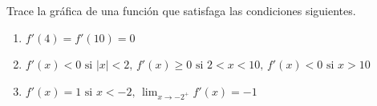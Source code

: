 \item Trace la gráfica de una función que satisfaga las condiciones siguientes.
    \begin{enumerate}
        \item[(a)] $f'(4) = f'(10) = 0$
        \item[(b)] $f'(x) < 0 \text{ si } |x| < 2, \, f'(x) \ge 0 \text{ si } 2 < x < 10, \, f'(x) < 0 \text{ si } x > 10$
        \item[(c)] $f'(x) = 1 \text{ si } x < -2, \, \displaystyle \lim_{x \to -2^+} f'(x) = -1$
    \end{enumerate}
